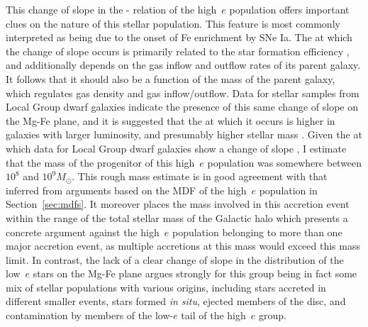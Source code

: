This change of slope in the \mgfe{}-\feh{} relation of the high~$e$
population offers important clues on the nature of this stellar
population. This feature is most commonly interpreted as being due
to the onset of Fe enrichment by SNe Ia.  The \feh{} at which the
change of slope occurs is primarily related to the star formation
efficiency \citep[e.g.][]{2017ApJ...837..183W}, and additionally
depends on the gas inflow and outflow rates of its parent galaxy.
It follows that it should also be a function of the mass of the
parent galaxy, which regulates gas density and gas inflow/outflow.
Data for stellar samples from Local Group dwarf galaxies indicate
the presence of this same change of slope on the Mg-Fe plane, and
it is suggested that the \feh{} at which it occurs is higher in
galaxies with larger luminosity, and presumably higher stellar mass
\citep[see,e.g.][]{2009ARA&A..47..371T}.  Given the \feh{} at which
data for Local Group dwarf galaxies show a change of slope
\citep[see,e.g.][]{2009ARA&A..47..371T}, I estimate that the mass
of the progenitor of this high~$e$ population was somewhere between
$10^{8}$ and $10^{9} M_\odot$. This rough mass estimate is in good
agreement with that inferred from arguments based on the MDF of the
high~$e$ population in Section~\ref{sec:mdfs}.  It moreover places
the mass involved in this accretion event within the range of the
total stellar mass of the Galactic halo \citep[$\sim 4 - 7 \times
10^8\ \mathrm{M_{\odot}}$] {2016ARA&A..54..529B} which presents a concrete argument against
the high~$e$ population belonging to more than one major accretion
event, as multiple accretions at this mass would exceed this mass
limit. In contrast, the lack of a clear change of slope in the
distribution of the low~$e$ stars on the Mg-Fe plane argues
strongly for this group being in fact some mix of stellar populations
with various origins, including stars accreted in different smaller
events, stars formed \emph{in situ}, ejected members of the disc,
 and contamination by members of the low-$e$ tail of the
high~$e$ group.

